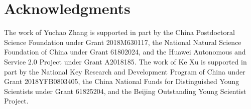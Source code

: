 \section*{Acknowledgments}
The work of Yuchao Zhang is supported in part by the China Postdoctoral Science Foundation under Grant 2018M630117, the National Natural Science Foundation of China under Grant 61802024, and the Huawei Autonomous and Service 2.0 Project under Grant A2018185. The work of Ke Xu is supported in part by the National Key Research and Development Program of China under Grant 2018YFB0803405, the China National Funds for Distinguished Young Scientists under Grant 61825204, and the Beijing Outstanding Young Scientist Project.
